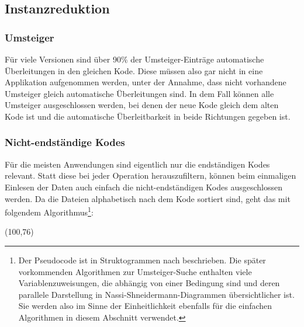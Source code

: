 \subsection{Instanzreduktion}
 
\subsubsection{Umsteiger}

Für viele Versionen sind über 90\% der Umsteiger-Einträge automatische Überleitungen in den gleichen Kode. Diese müssen also gar nicht in eine Applikation aufgenommen werden, unter der Annahme, dass nicht vorhandene Umsteiger gleich automatische Überleitungen sind. In dem Fall können alle Umsteiger ausgeschlossen werden, bei denen der neue Kode gleich dem alten Kode ist und die automatische Überleitbarkeit in beide Richtungen gegeben ist. 

\subsubsection{Nicht-endständige Kodes}

Für die meisten Anwendungen sind eigentlich nur die endständigen Kodes relevant. Statt diese bei jeder Operation herauszufiltern, können beim einmaligen Einlesen der Daten auch einfach die nicht-endständigen Kodes ausgeschlossen werden. Da die Dateien alphabetisch nach dem Kode sortiert sind, geht das mit folgendem Algorithmus\footnote{Der Pseudocode ist in Struktogrammen nach \citep{nassishneid} beschrieben. Die später vorkommenden Algorithmen zur Umsteiger-Suche enthalten viele Variablenzuweisungen, die abhängig von einer Bedingung sind und deren parallele Darstellung in Nassi-Shneidermann-Diagrammen übersichtlicher ist. Sie werden also im Sinne der Einheitlichkeit ebenfalls für die einfachen Algorithmen in diesem Abschnitt verwendet.}:

\begin{struktogramm}(100,76)
    \change
    \ifend
    \whileend
\end{struktogramm}

